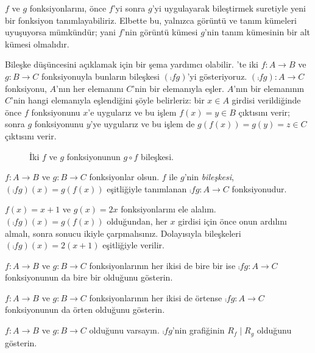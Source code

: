 \documentclass[../../../include/open-logic-section]{subfiles}
\begin{document}

\begin{explain}
$f$ ve $g$
fonksiyonlarını, önce $f$'yi sonra $g$'yi uygulayarak bileştirmek suretiyle yeni
bir fonksiyon tanımlayabiliriz. Elbette bu, yalnızca görüntü ve tanım kümeleri
uyuşuyorsa mümkündür; yani $f$'nin görüntü kümesi $g$'nin tanım kümesinin bir
alt kümesi olmalıdır. 

Bileşke düşüncesini açıklamak için bir şema yardımcı olabilir.
'te iki $f \colon A \to B$ ve $g \colon B \to C$
fonksiyonuyla bunların bileşkesi $(\comp{f}{g})$'yi gösteriyoruz.
$(\comp{f}{g}) \colon A \to C$ fonksiyonu, $A$'nın her elemanını $C$'nin bir
elemanıyla eşler. $A$'nın bir elemanının $C$'nin hangi elemanıyla
eşlendiğini şöyle belirleriz: bir $x \in A$ girdisi verildiğinde önce $f$
fonksiyonunu $x$'e uygularız ve bu işlem $f(x)=y \in B$ çıktısını verir;
sonra $g$ fonksiyonunu $y$'ye uygularız ve bu işlem de
$g(f(x))=g(y)=z \in C$ çıktısını verir.
\begin{figure}
  \caption{İki $f$ ve $g$ fonksiyonunun $g \circ f$ bileşkesi.}
\end{figure}
\end{explain}

\begin{defn}[Bileşke]
$f\colon A \to B$ ve $g\colon B \to C$ fonksiyonlar olsun. $f$ ile $g$'nin
\emph{bileşkesi}, $(\comp{f}{g})(x)=g(f(x))$ eşitliğiyle tanımlanan
$\comp{f}{g} \colon A \to C$ fonksiyonudur.
\end{defn}

\begin{ex}
$f(x)=x+1$ ve $g(x)=2x$ fonksiyonlarını ele alalım.
$(\comp{f}{g})(x)=g(f(x))$ olduğundan, her $x$ girdisi için önce onun
ardılını almalı, sonra sonucu ikiyle çarpmalısınız. Dolayısıyla bileşkeleri
$(\comp{f}{g})(x)=2(x+1)$ eşitliğiyle verilir.
\end{ex}

\begin{prob}
$f \colon A \to B$ ve $g \colon B \to C$ fonksiyonlarının her ikisi de
bire bir ise $\comp{f}{g}\colon A \to C$ fonksiyonunun da bire bir olduğunu
gösterin.
\end{prob}

\begin{prob}
$f \colon A \to B$ ve $g \colon B \to C$ fonksiyonlarının her ikisi de
örtense $\comp{f}{g}\colon A \to C$ fonksiyonunun da örten olduğunu gösterin.
\end{prob}

\begin{prob}
$f \colon A \to B$ ve $g \colon B \to C$ olduğunu varsayın.
$\comp{f}{g}$'nin grafiğinin $R_f \mid R_g$ olduğunu gösterin.
\end{prob}
\end{document}
